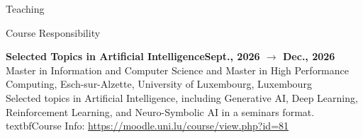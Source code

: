 \documentclass{resume} %
\begin{document}
    \begin{rSection}{Teaching}


        \begin{rSubsection2}{Course Responsibility}
            \item\textbf{Selected Topics in Artificial Intelligence}\hfill \textbf{Sept., 2026 $\rightarrow$ Dec., 2026}
            \\Master in Information and Computer Science and Master in High Performance Computing, Esch-sur-Alzette, University of Luxembourg, Luxembourg
            \\Selected topics in Artificial Intelligence, including Generative AI, Deep Learning, Reinforcement Learning, and Neuro-Symbolic AI in a seminars format.
            \\textbf{Course Info:} \url{https://moodle.uni.lu/course/view.php?id=81}
        \end{rSubsection2}



\end{rSection}
\end{document}
